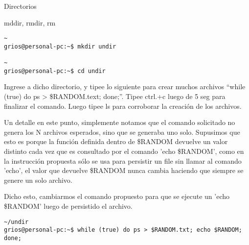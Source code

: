 \begin{section}{Directorios}
\begin{subsection}{mddir, rmdir, rm}
\begin{lstlisting}[style=Ubuntu]
~
grios@personal-pc:~$ mkdir undir

~
grios@personal-pc:~$ cd undir

\end{lstlisting}


\begin{quoting}
Ingrese a dicho directorio, y tipee lo siguiente para crear muchos archivos “while (true) do ps >
\$RANDOM.text; done;”. Tipee ctrl.+c luego de 5 seg para finalizar el comando. Luego tipee ls para
corroborar la creación de los archivos.
\end{quoting}

Un detalle en este punto, simplemente notamos que el comando solicitado no genera los N archivos esperados, sino que se generaba uno solo. Supusimos que esto es porque la función definida dentro de \$RANDOM devuelve un valor distinto cada vez que es consultado por el comando 'echo \$RANDOM', como en la instrucción propuesta sólo se usa para persistir un file sin llamar al comando 'echo', el valor que devuelve \$RANDOM nunca cambia haciendo que siempre se genere un solo archivo.

Dicho esto, cambiarmos el comando propuesto para que se ejecute un 'echo \$RANDOM' luego de persistido el archivo.

\begin{lstlisting}[style=Ubuntu]
~/undir
grios@personal-pc:~$ while (true) do ps > $RANDOM.txt; echo $RANDOM; done;


\end{lstlisting}
\end{subsection}
\end{section}
